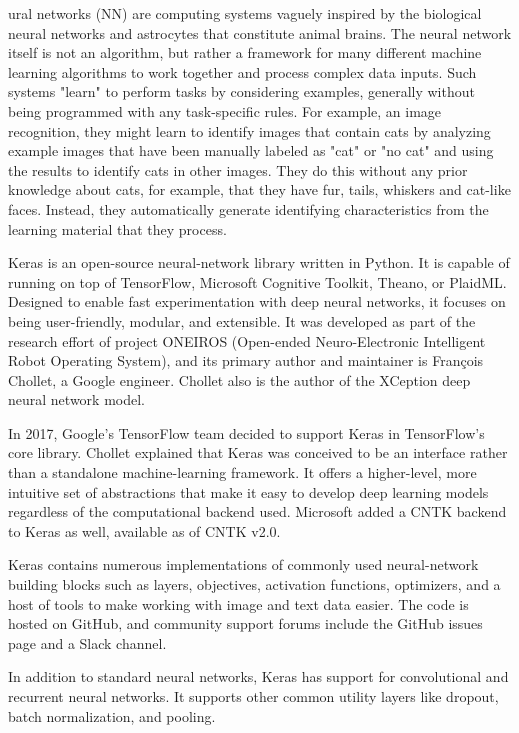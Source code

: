 \documentclass[journal]{IEEEtran}
\begin{document}
ural networks (NN) are computing systems vaguely inspired by the biological neural networks and astrocytes that constitute animal brains. The neural network itself is not an algorithm, but rather a framework for many different machine learning algorithms to work together and process complex data inputs. Such systems "learn" to perform tasks by considering examples, generally without being programmed with any task-specific rules. For example, an image recognition, they might learn to identify images that contain cats by analyzing example images that have been manually labeled as "cat" or "no cat" and using the results to identify cats in other images. They do this without any prior knowledge about cats, for example, that they have fur, tails, whiskers and cat-like faces. Instead, they automatically generate identifying characteristics from the learning material that they process.

Keras is an open-source neural-network library written in Python. It is capable of running on top of TensorFlow, Microsoft Cognitive Toolkit, Theano, or PlaidML. Designed to enable fast experimentation with deep neural networks, it focuses on being user-friendly, modular, and extensible. It was developed as part of the research effort of project ONEIROS (Open-ended Neuro-Electronic Intelligent Robot Operating System), and its primary author and maintainer is François Chollet, a Google engineer. Chollet also is the author of the XCeption deep neural network model.

In 2017, Google's TensorFlow team decided to support Keras in TensorFlow's core library. Chollet explained that Keras was conceived to be an interface rather than a standalone machine-learning framework. It offers a higher-level, more intuitive set of abstractions that make it easy to develop deep learning models regardless of the computational backend used. Microsoft added a CNTK backend to Keras as well, available as of CNTK v2.0.

Keras contains numerous implementations of commonly used neural-network building blocks such as layers, objectives, activation functions, optimizers, and a host of tools to make working with image and text data easier. The code is hosted on GitHub, and community support forums include the GitHub issues page and a Slack channel.

In addition to standard neural networks, Keras has support for convolutional and recurrent neural networks. It supports other common utility layers like dropout, batch normalization, and pooling.
\end{document}
